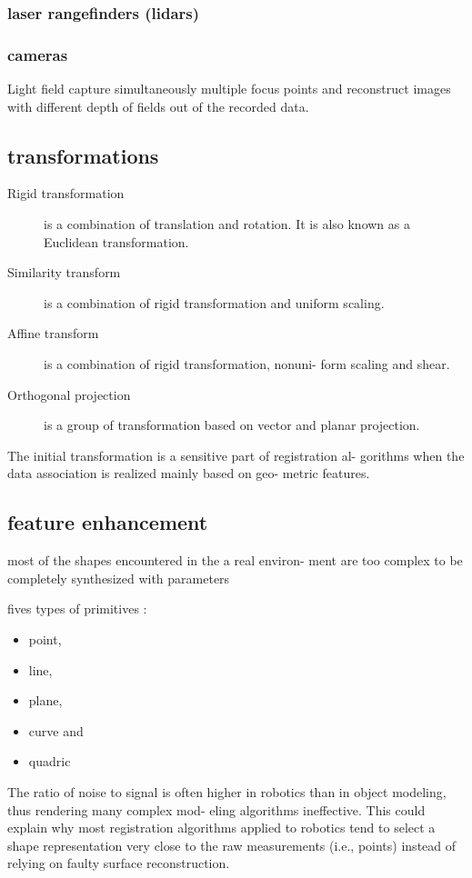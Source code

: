 \documentclass[twoside,twocolumn]{article}
\begin{document}
\subsubsection{laser rangefinders (lidars)}
\subsubsection{cameras}
Light field capture simultaneously multiple focus
points and reconstruct images with different depth of fields out of the
recorded data.


\subsection{transformations}
\begin{description}
  \item[Rigid transformation] is a combination of translation and rotation.
It is also known as a Euclidean transformation.
\item[Similarity transform] is a combination of rigid transformation and
uniform scaling.
\item[Affine transform] is a combination of rigid transformation, nonuni-
form scaling and shear.
\item[Orthogonal projection] is a group of transformation based on vector
and planar projection.
\end{description}

The initial transformation is a sensitive part of registration al-
gorithms when the data association is realized mainly based on geo-
metric features.

\subsection{feature enhancement}
most of the shapes encountered in the a real environ-
ment are too complex to be completely synthesized with parameters

fives types of primitives :
\begin{itemize}
  \item point,
  \item line,
  \item plane,
  \item curve and
  \item quadric
\end{itemize}


The ratio of noise to signal is often higher in
robotics than in object modeling, thus rendering many complex mod-
eling algorithms ineffective. This could explain why most registration
algorithms applied to robotics tend to select a shape representation
very close to the raw measurements (i.e., points) instead of relying on
faulty surface reconstruction.
\end{document}
